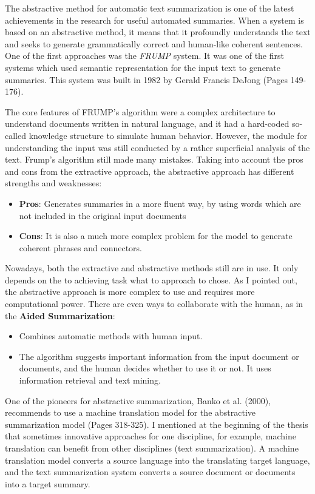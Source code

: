 The abstractive method for automatic text summarization is one of the latest achievements in the research for useful automated summaries. When a system is based on an abstractive method, it means that it profoundly understands the text and seeks to generate grammatically correct and human-like coherent sentences. One of the first approaches was the \textit{FRUMP} system. It was one of the first systems which used semantic representation for the input text to generate summaries. This system was built in 1982 by Gerald Francis DeJong \cite{Dej82} (Pages 149-176).


The core features of FRUMP's algorithm were a complex architecture to understand documents written in natural language, and it had a hard-coded so-called knowledge structure \cite{Dej82} to simulate human behavior. However, the module for understanding the input was still conducted by a rather superficial analysis of the text. Frump's algorithm still made many mistakes. Taking into account the pros and cons from the extractive approach, the abstractive approach has different strengths and weaknesses:

\begin{itemize}
	\item \textbf{Pros}: Generates summaries in a more fluent way, by using words which are not included in the original input documents
	\item \textbf{Cons}: It is also a much more complex problem for the model to generate coherent phrases and connectors.
\end{itemize}


Nowadays, both the extractive and abstractive methods still are in use. It only depends on the to achieving task what to approach to chose. As I pointed out, the abstractive approach is more complex to use and requires more computational power. There are even ways to collaborate with the human, as in the \textbf{Aided Summarization}:

\begin{itemize}
	\item Combines automatic methods with human input.
	\item The algorithm suggests important information from the input document or documents, and the human decides whether to use it or not. It uses information retrieval and text mining.
\end{itemize}

One of the pioneers for abstractive summarization, Banko et al. (2000), recommends to use a machine translation model for the abstractive summarization model \cite{banko-etal-2000-headline} (Pages 318-325). I mentioned at the beginning of the thesis that sometimes innovative approaches for one discipline, for example, machine translation can benefit from other disciplines (text summarization). A machine translation model converts a source language into the translating target language, and the text summarization system converts a source document or documents into a target summary.


